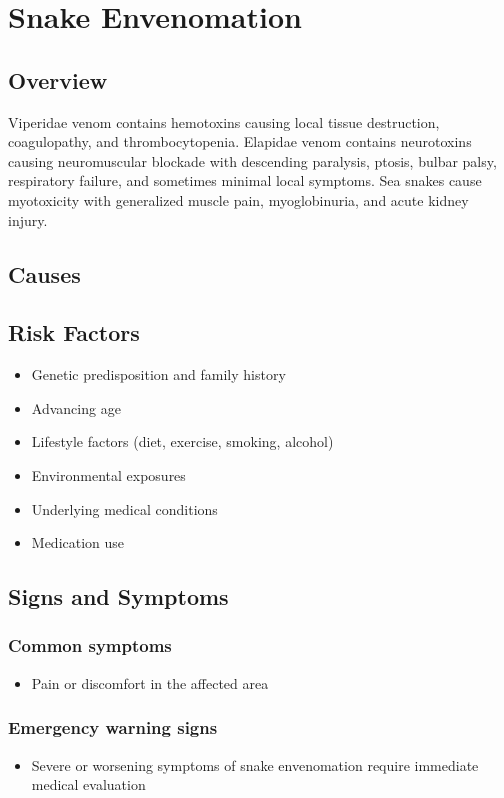 \chapter{Snake Envenomation}
\label{sec:Snake Envenomation}

\section{Overview}
Viperidae venom contains hemotoxins causing local tissue destruction, coagulopathy, and thrombocytopenia. Elapidae venom contains neurotoxins causing neuromuscular blockade with descending paralysis, ptosis, bulbar palsy, respiratory failure, and sometimes minimal local symptoms. Sea snakes cause myotoxicity with generalized muscle pain, myoglobinuria, and acute kidney injury.
\section{Causes}
\section{Risk Factors}

\begin{itemize}[noitemsep]
  \item Genetic predisposition and family history
  \item Advancing age
  \item Lifestyle factors (diet, exercise, smoking, alcohol)
  \item Environmental exposures
  \item Underlying medical conditions
  \item Medication use
\end{itemize}
\section{Signs and Symptoms}

\subsection{Common symptoms}
\begin{itemize}[noitemsep]
  \item Pain or discomfort in the affected area
  \end{itemize}

\subsection{Emergency warning signs}
\begin{itemize}[noitemsep]
  \item Severe or worsening symptoms of snake envenomation require immediate medical evaluation
\end{itemize}
